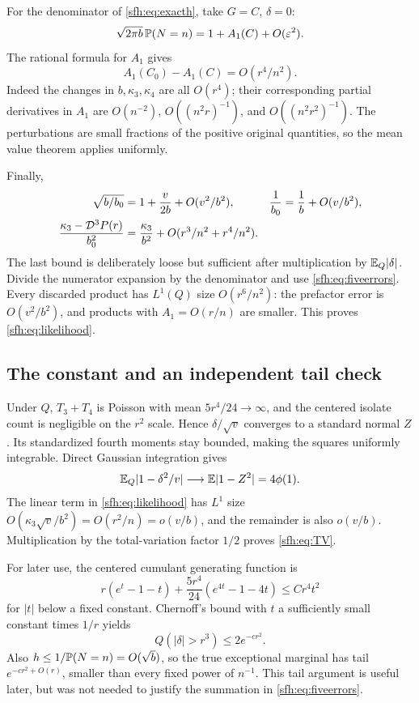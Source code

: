 For the denominator of \eqref{sfh:eq:exacth}, take $G=C$, $\delta=0$:
\[
 \sqrt{2\pi b}\,\mathbb P(N=n)=1+A_1(C)+O(\varepsilon^2).
\]
The rational formula for $A_1$ gives
\begin{equation}\label{sfh:eq:A1change}
 A_1(C_0)-A_1(C)=O(r^4/n^2).
\end{equation}
Indeed the changes in $b,\kappa_3,\kappa_4$ are all $O(r^4)$; their corresponding partial derivatives in $A_1$ are $O(n^{-2})$, $O((n^2r)^{-1})$, and $O((n^2r^2)^{-1})$. The perturbations are small fractions of the positive original quantities, so the mean value theorem applies uniformly.

Finally,
\begin{align*}
 \sqrt{b/b_0}&=1+\frac v{2b}+O(v^2/b^2),&
 \frac1{b_0}&=\frac1b+O(v/b^2),\\
 \frac{\kappa_3-\mathcal D^3P(r)}{b_0^2}
 &=\frac{\kappa_3}{b^2}+O(r^3/n^2+r^4/n^2).
\end{align*}
The last bound is deliberately loose but sufficient after multiplication by $\mathbb E_Q|\delta|$. Divide the numerator expansion by the denominator and use \eqref{sfh:eq:fiveerrors}. Every discarded product has $L^1(Q)$ size $O(r^6/n^2)$: the prefactor error is $O(v^2/b^2)$, and products with $A_1=O(r/n)$ are smaller. This proves \eqref{sfh:eq:likelihood}.

\subsection{The constant and an independent tail check}
Under $Q$, $T_3+T_4$ is Poisson with mean $5r^4/24\to\infty$, and the centered isolate count is negligible on the $r^2$ scale. Hence $\delta/\sqrt v$ converges to a standard normal $Z$. Its standardized fourth moments stay bounded, making the squares uniformly integrable. Direct Gaussian integration gives
\[
 \mathbb E_Q|1-\delta^2/v|\longrightarrow\mathbb E|1-Z^2|=4\phi(1).
\]
The linear term in \eqref{sfh:eq:likelihood} has $L^1$ size
$O(\kappa_3\sqrt v/b^2)=O(r^2/n)=o(v/b)$, and the remainder is also $o(v/b)$. Multiplication by the total-variation factor $1/2$ proves \eqref{sfh:eq:TV}.

For later use, the centered cumulant generating function is
\[
 r(e^t-1-t)+\frac{5r^4}{24}(e^{4t}-1-4t)\le Cr^4t^2
\]
for $|t|$ below a fixed constant. Chernoff's bound with $t$ a sufficiently small constant times $1/r$ yields
\begin{equation}\label{sfh:eq:tail}
 Q(|\delta|>r^3)\le2e^{-cr^2}.
\end{equation}
Also $h\le1/\mathbb P(N=n)=O(\sqrt b)$, so the true exceptional marginal has tail $e^{-cr^2+O(r)}$, smaller than every fixed power of $n^{-1}$. This tail argument is useful later, but was not needed to justify the summation in \eqref{sfh:eq:fiveerrors}.
